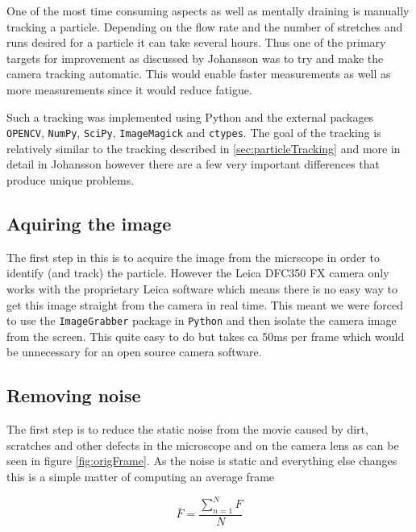 %
%
%
%
%

One of the most time consuming aspects as well as mentally draining is manually tracking a particle. Depending on the flow rate and the number of stretches and runs desired for a particle it can take several hours. Thus one of the primary targets for improvement as discussed by Johansson \cite{AntonThesis} was to try and make the camera tracking automatic. This would enable faster measurements as well as more measurements since it would reduce fatigue. 

Such a tracking was implemented using Python and the external packages \texttt{OPENCV}, \texttt{NumPy}, \texttt{SciPy}, \texttt{ImageMagick} and \texttt{ctypes}. The goal of the tracking is relatively similar to the tracking described in \ref{sec:particleTracking} and more in detail in Johansson \cite{AntonThesis} however there are a few very important differences that produce unique problems. 

\subsection{Aquiring the image}
The first step in this is to acquire the image from the micrscope in order to identify (and track) the particle. However the Leica DFC350 FX camera only works with the proprietary Leica software which means there is no easy way to get this image straight from the camera in real time. This meant we were forced to use the \texttt{ImageGrabber} package in \texttt{Python} and then isolate the camera image from the screen. This quite easy to do but takes ca 50ms per frame which would be unnecessary for an open source camera software. 

\subsection{Removing noise}
The first step is to reduce the static noise from the movie caused by dirt, scratches and other defects in the microscope and on the camera lens as can be seen in figure \ref{fig:origFrame}. As the noise is static and everything else changes this is a simple matter of computing an average frame

\begin{equation}\label{eq:averageFrame}
\bar{F} = \frac{\sum\limits_{n=1}^{N} F }{N}
\end{equation}

